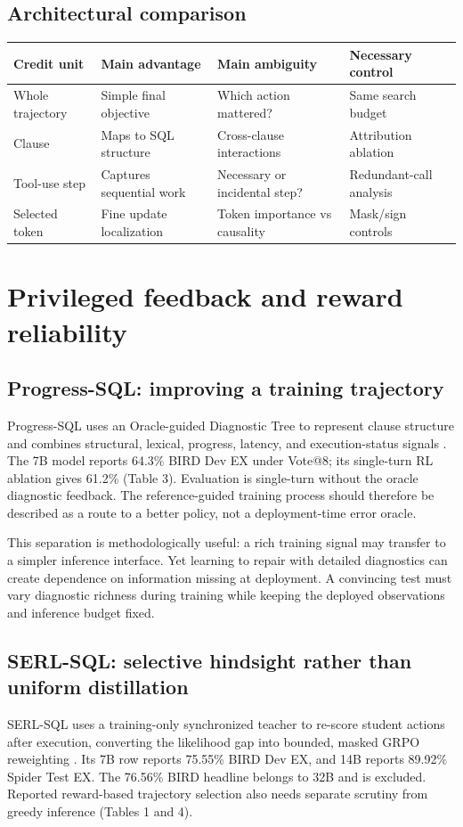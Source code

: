 \documentclass[11pt,a4paper]{article}
\begin{document}
\subsection{Architectural comparison}
\begin{center}\small
\begin{tabularx}{\textwidth}{@{}p{26mm}YYY@{}}
\toprule
Credit unit & Main advantage & Main ambiguity & Necessary control\\
\midrule
Whole trajectory & Simple final objective & Which action mattered? & Same search budget\\
Clause & Maps to SQL structure & Cross-clause interactions & Attribution ablation\\
Tool-use step & Captures sequential work & Necessary or incidental step? & Redundant-call analysis\\
Selected token & Fine update localization & Token importance vs causality & Mask/sign controls\\
\bottomrule
\end{tabularx}
\end{center}

\clearpage
\section{Privileged feedback and reward reliability}
\subsection{Progress-SQL: improving a training trajectory}
Progress-SQL uses an Oracle-guided Diagnostic Tree to represent clause structure and combines structural, lexical, progress, latency, and execution-status signals \cite{progress}. The 7B model reports 64.3\% BIRD Dev EX under Vote@8; its single-turn RL ablation gives 61.2\% (Table 3). Evaluation is single-turn without the oracle diagnostic feedback. The reference-guided training process should therefore be described as a route to a better policy, not a deployment-time error oracle.

This separation is methodologically useful: a rich training signal may transfer to a simpler inference interface. Yet learning to repair with detailed diagnostics can create dependence on information missing at deployment. A convincing test must vary diagnostic richness during training while keeping the deployed observations and inference budget fixed.

\subsection{SERL-SQL: selective hindsight rather than uniform distillation}
SERL-SQL uses a training-only synchronized teacher to re-score student actions after execution, converting the likelihood gap into bounded, masked GRPO reweighting \cite{serl}. Its 7B row reports 75.55\% BIRD Dev EX, and 14B reports 89.92\% Spider Test EX. The 76.56\% BIRD headline belongs to 32B and is excluded. Reported reward-based trajectory selection also needs separate scrutiny from greedy inference (Tables 1 and 4).
\end{document}
